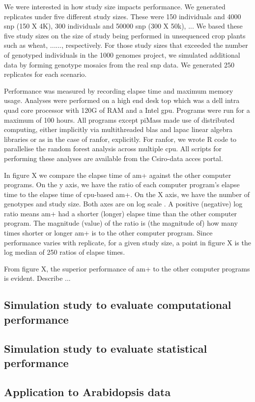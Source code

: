 \documentclass[12pt]{article}
\begin{document}
We were interested in how study size impacts performance. We generated replicates under five different study sizes. These were 150 individuals and 4000 snp (150 X 4K), 300 individuals and 50000 snp (300 X 50k), ... We based these five study sizes on the size of study being performed in unsequenced crop plants such as wheat, ......, respectively. For those study sizes that exceeded the number of genotyped individuals in the 1000 genomes project,  we simulated additional data by forming genotype mosaics from the real snp data. We generated 250 replicates for each scenario. 

Performance was measured by recording elapse  time and maximum memory usage. Analyses were performed on a high end desk top which was a dell intra quad core processor with 120G of RAM and a Intel gpu. Programs were run for a maximum of 100 hours.  All programs except piMass  made use of distributed computing, either implicitly via multithreaded blas and lapac linear algebra libraries or as in the case of ranfor, explicitly. For ranfor, we wrote R code to parallelise the random forest analysis across multiple cpu.  All scripts for performing these analyses are available from the Csiro-data acces portal.

In figure X we compare the elapse time of  am+ against the other computer programs. On the y axis, we have the ratio of each computer program's elapse time to the elapse time of cpu-based am+. On the X axis, we have the number of genotypes and study size. Both axes are on log scale . A positive (negative) log ratio means am+ had a shorter (longer) elapse time  than the other computer program. The magnitude (value) of the ratio is (the magnitude of)  how many times shorter or longer am+ is to the other computer program.  Since performance varies with replicate, for a given study size, a point in figure X is the log median of 250  ratios of elapse times.


From figure X, the superior performance of am+ to the other computer programs is evident. Describe ...


\subsection{Simulation study to evaluate computational performance}

\subsection{Simulation study to evaluate statistical performance}

\subsection{Application to Arabidopsis data}
\end{document}
